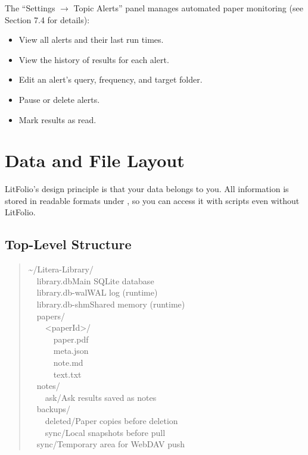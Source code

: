 The ``Settings $\rightarrow$ Topic Alerts'' panel manages automated paper monitoring
(see Section 7.4 for details):

\begin{itemize}
  \item View all alerts and their last run times.
  \item View the history of results for each alert.
  \item Edit an alert's query, frequency, and target folder.
  \item Pause or delete alerts.
  \item Mark results as read.
\end{itemize}

\chapter{Data and File Layout}
\label{ch:data}

LitFolio's design principle is that your data belongs to you. All information is stored in
readable formats under , so you can access it with
scripts even without LitFolio.

\section{Top-Level Structure}

\begin{quote}\small\ttfamily
\textasciitilde/Litera-Library/\\
\ \ library.db\hfill\textnormal{\small Main SQLite database}\\
\ \ library.db-wal\hfill\textnormal{\small WAL log (runtime)}\\
\ \ library.db-shm\hfill\textnormal{\small Shared memory (runtime)}\\
\ \ papers/\\
\ \ \ \ \textless paperId\textgreater /\\
\ \ \ \ \ \ paper.pdf\\
\ \ \ \ \ \ meta.json\\
\ \ \ \ \ \ note.md\\
\ \ \ \ \ \ text.txt\\
\ \ notes/\\
\ \ \ \ ask/\hfill\textnormal{\small Ask results saved as notes}\\
\ \ backups/\\
\ \ \ \ deleted/\hfill\textnormal{\small Paper copies before deletion}\\
\ \ \ \ sync/\hfill\textnormal{\small Local snapshots before pull}\\
\ \ sync/\hfill\textnormal{\small Temporary area for WebDAV push}
\end{quote}

